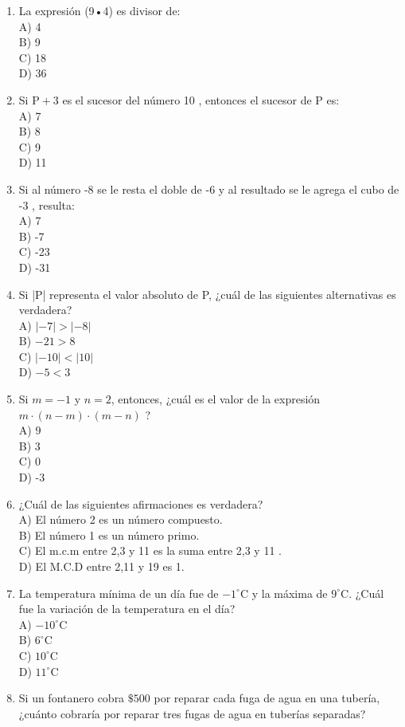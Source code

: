 \documentclass[10pt]{article}
\begin{document}
\begin{enumerate}
D) 2
  \item La expresión (9•4) es divisor de:\\
A) 4\\
B) 9\\
C) 18\\
D) 36
  \item Si $\mathrm{P}+3$ es el sucesor del número 10 , entonces el sucesor de P es:\\
A) 7\\
B) 8\\
C) 9\\
D) 11
  \item Si al número -8 se le resta el doble de -6 y al resultado se le agrega el cubo de -3 , resulta:\\
A) 7\\
B) -7\\
C) -23\\
D) -31
  \item Si |P| representa el valor absoluto de P, ¿cuál de las siguientes alternativas es verdadera?\\
A) $|-7|>|-8|$\\
B) $-21>8$\\
C) $|-10|<|10|$\\
D) $-5<3$
  \item Si $m=-1$ y $n=2$, entonces, ¿cuál es el valor de la expresión $m \cdot(n-m) \cdot(m-n)$ ?\\
A) 9\\
B) 3\\
C) 0\\
D) -3
  \item ¿Cuál de las siguientes afirmaciones es verdadera?\\
A) El número 2 es un número compuesto.\\
B) El número 1 es un número primo.\\
C) El m.c.m entre 2,3 y 11 es la suma entre 2,3 y 11 .\\
D) El M.C.D entre 2,11 y 19 es 1.
  \item La temperatura mínima de un día fue de $-1^{\circ} \mathrm{C}$ y la máxima de $9^{\circ} \mathrm{C}$. ¿Cuál fue la variación de la temperatura en el día?\\
A) $-10^{\circ} \mathrm{C}$\\
B) $6^{\circ} \mathrm{C}$\\
C) $10^{\circ} \mathrm{C}$\\
D) $11^{\circ} \mathrm{C}$
  \item Si un fontanero cobra $\$ 500$ por reparar cada fuga de agua en una tubería, ¿cuánto cobraría por reparar tres fugas de agua en tuberías separadas?\\

\end{enumerate}
\end{document}
